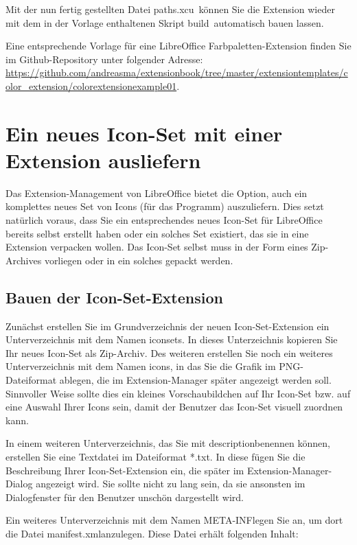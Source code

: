 \documentclass[a4paper,10pt,pagesize,titlepage]{scrbook}
\begin{document}
Mit der nun fertig gestellten Datei \glqq paths.xcu\grqq~können Sie die Extension wieder mit dem in der Vorlage enthaltenen Skript \glqq build\grqq~automatisch bauen lassen.

Eine entsprechende Vorlage für eine LibreOffice Farbpaletten-Extension finden Sie im Github-Repository unter folgender Adresse:
\url{https://github.com/andreasma/extensionbook/tree/master/extensiontemplates/color_extension/colorextensionexample01}.

\chapter{Ein neues Icon-Set mit einer Extension ausliefern}

Das Extension-Management von LibreOffice bietet die Option, auch ein komplettes neues Set von Icons (für das Programm) auszuliefern. Dies setzt natürlich voraus, dass Sie ein
entsprechendes neues Icon-Set für LibreOffice bereits selbst erstellt haben oder ein solches Set existiert, das sie in eine Extension verpacken wollen. Das Icon-Set selbst muss in der Form eines Zip-Archives vorliegen oder in ein solches gepackt werden.

\section{Bauen der Icon-Set-Extension}

Zunächst erstellen Sie im Grundverzeichnis der neuen Icon-Set-Extension ein Unterverzeichnis mit dem Namen \glqq iconsets\grqq. In dieses Unterzeichnis kopieren Sie Ihr neues Icon-Set als Zip-Archiv. Des weiteren erstellen Sie noch ein weiteres Unterverzeichnis mit dem Namen \glqq icons\grqq, in das Sie die Grafik im PNG-Dateiformat ablegen, die im Extension-Manager später angezeigt werden soll. Sinnvoller Weise sollte dies ein kleines Vorschaubildchen auf Ihr Icon-Set bzw. auf eine Auswahl Ihrer Icons sein, damit der Benutzer das Icon-Set visuell zuordnen 
kann.

In einem weiteren Unterverzeichnis, das Sie mit \glqq description\grqq benennen können, erstellen Sie eine Textdatei im Dateiformat *.txt. In diese fügen Sie die Beschreibung Ihrer Icon-Set-Extension ein, die später im Extension-Manager-Dialog angezeigt wird. Sie sollte nicht zu lang sein, da sie ansonsten im Dialogfenster für den Benutzer unschön dargestellt wird.

Ein weiteres Unterverzeichnis mit dem Namen \glqq META-INF\grqq legen Sie an, um dort die Datei \glqq manifest.xml\grqq anzulegen. Diese Datei erhält folgenden Inhalt:
\end{document}
